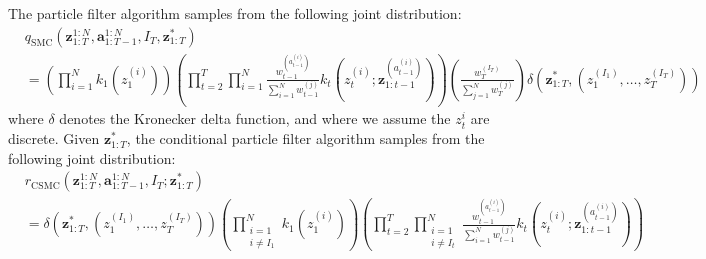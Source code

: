 \documentclass[11pt]{article}
\newcommand{\z}{\mathbf{z}}
\newcommand{\abold}{\mathbf{a}}
\begin{document}
The particle filter algorithm samples from the following joint distribution:
\begin{align*}
    & q_{\mathrm{SMC}}(\z_{1:T}^{1:N}, \abold_{1:T-1}^{1:N}, I_T, \z_{1:T}^*)\\
    &=  \left( \prod_{i=1}^N k_1(z_1^{(i)}) \right)
        \left( \prod_{t=2}^T \prod_{i=1}^N \frac{w_{t-1}^{(a_{t-1}^{(i)})}}{\sum_{i=1}^N w_{t-1}^{(j)}} k_t(z_t^{(i)}; \z_{1:t-1}^{(a_{t-1}^{(i)})} )\right)
        \left( \frac{w_T^{(I_T)}}{\sum_{j=1}^N w_T^{(j)}} \right)
        \delta(\z_{1:T}^*,  (z_1^{(I_1)}, \ldots, z_T^{(I_T)}))
\end{align*}
where $\delta$ denotes the Kronecker delta function, and where we assume the $z_{t}^i$ are discrete.
Given $\z_{1:T}^*$, the conditional particle filter algorithm samples from the following joint distribution:
\begin{align*}
    & r_{\mathrm{CSMC}}(\z_{1:T}^{1:N}, \abold_{1:T-1}^{1:N}, I_T; \z_{1:T}^*)\\
    &=  \delta(\z_{1:T}^*,  (z_1^{(I_1)}, \ldots, z_T^{(I_T)}))
        \left( \prod_{\substack{i=1\\i \ne I_1}}^N k_1(z_1^{(i)}) \right)
        \left( \prod_{t=2}^T \prod_{\substack{i=1\\i \ne I_t}}^N \frac{w_{t-1}^{(a_{t-1}^{(i)})}}{\sum_{i=1}^N w_{t-1}^{(j)}} k_t(z_t^{(i)}; \z_{1:t-1}^{(a_{t-1}^{(i)})} )\right)
\end{align*}
\end{document}
